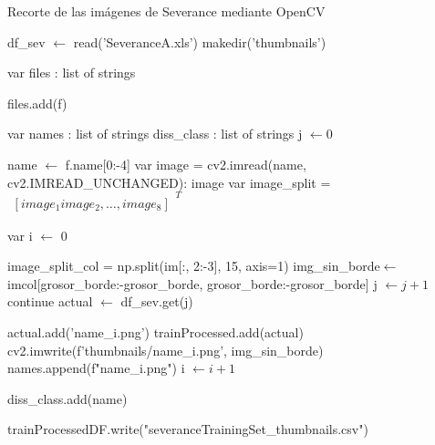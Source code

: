  \begin{algorithm}[H]
	\label{fig:cortarseverance}
	\caption{Recorte de las imágenes de Severance mediante OpenCV}
	\begin{algorithmic}
		
		\State  df\_sev $\gets$ read('SeveranceA.xls')
		\State makedir('thumbnails')
		\EndIf
		
		\State var files : list of strings
		
		\If {f is\_file()]}
		\State files.add(f)
		\EndIf
		\EndFor
		
		\State var names : list of strings
		\State diss\_class : list of strings
		\State j $\gets 0$
		
		\State name $\gets$ f.name[0:-4]
		\State var image = cv2.imread(name, cv2.IMREAD\_UNCHANGED): image
		\State var image\_split = $\begin{matrix}
			[ image_1 image_2, \ldots, image_8 ] \end{matrix}^T$	
		
		
		\State var i $\gets$ 0
		
		\State image\_split\_col = np.split(im[:, 2:-3], 15, axis=1)
		\State img\_sin\_borde$\gets$ imcol[grosor\_borde:-grosor\_borde, grosor\_borde:-grosor\_borde]
		  
		\State j $\gets j + 1$  
		\State continue
		\Else
		\State actual  $\gets$ df\_sev.get(j)
		
		\State	actual.add('{name}\_{i}.png')
		\State	trainProcessed.add(actual)
		\EndIf
		\State cv2.imwrite(f'thumbnails/{name}\_{i}.png', img\_sin\_borde)
		\State names.append(f"{name}\_{i}.png")
		\State i $\gets i + 1 $
		
		\State diss\_class.add(name)
		\EndFor
		
		\EndFor
		\EndIf	 
		\EndFor
		\State trainProcessedDF.write("severanceTrainingSet\_thumbnails.csv") 
		\EndProcedure
	\end{algorithmic}
\end{algorithm}
 
